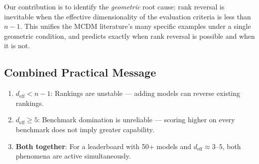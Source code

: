 Our contribution is to identify the \emph{geometric} root cause: rank reversal is inevitable when the effective dimensionality of the evaluation criteria is less than $n - 1$. This unifies the MCDM literature's many specific examples under a single geometric condition, and predicts exactly when rank reversal is possible and when it is not.

\subsection{Combined Practical Message}

\begin{enumerate}
  \item \textbf{$d_{\mathrm{eff}} < n - 1$}: Rankings are unstable --- adding models can reverse existing rankings.
  \item \textbf{$d_{\mathrm{eff}} \geq 5$}: Benchmark domination is unreliable --- scoring higher on every benchmark does not imply greater capability.
  \item \textbf{Both together}: For a leaderboard with 50+ models and $d_{\mathrm{eff}} \approx 3\text{--}5$, both phenomena are active simultaneously.
\end{enumerate}

